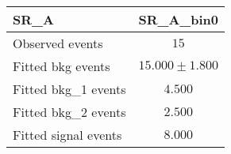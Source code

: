 %

\begin{tabular}{lc}
\toprule
SR\_A & SR\_A\_bin0 \\
\midrule
Observed events & $15$\\

\midrule
Fitted bkg events & $  15.000 \pm    1.800$\\

\midrule
Fitted bkg\_1 events & $   4.500$\\
Fitted bkg\_2 events & $   2.500$\\
Fitted signal events & $   8.000$\\

\bottomrule
\end{tabular}

